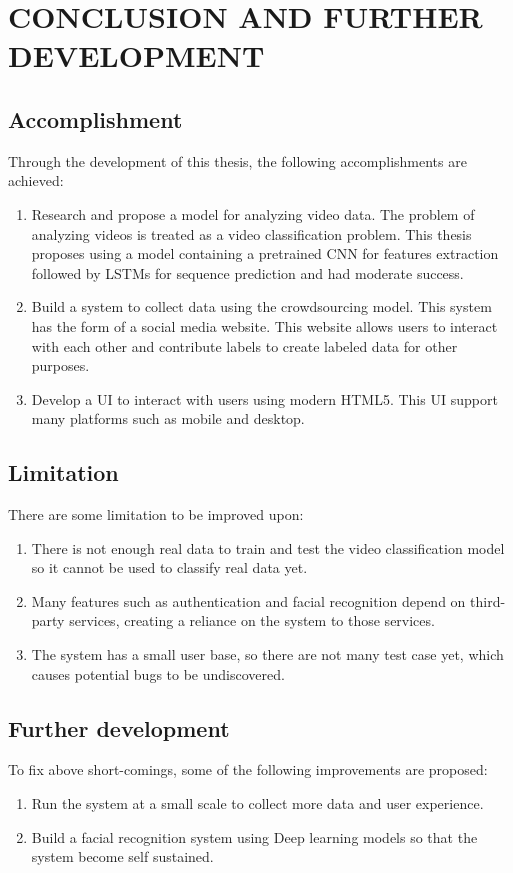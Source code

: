 \chapter{CONCLUSION AND FURTHER DEVELOPMENT}

\section{Accomplishment}
Through the development of this thesis, the following accomplishments are achieved:
\begin{enumerate}
    \item Research and propose a model for analyzing video data. The problem of analyzing videos is treated as a video classification problem. This thesis proposes using a model containing a pretrained CNN for features extraction followed by LSTMs for sequence prediction and had moderate success.
    \item Build a system to collect data using the crowdsourcing model. This system has the form of a social media website. This website allows users to interact with each other and contribute labels to create labeled data for other purposes.
    \item Develop a UI to interact with users using modern HTML5. This UI support many platforms such as mobile and desktop.
\end{enumerate}


\section{Limitation}
There are some limitation to be improved upon:

\begin{enumerate}

\item There is not enough real data to train and test the video classification model so it cannot be used to classify real data yet.
\item Many features such as authentication and facial recognition depend on third-party services, creating a reliance on the system to those services.
\item The system has a small user base, so there are not many test case yet, which causes potential bugs to be undiscovered.
\end{enumerate}

\section{Further development}
To fix above short-comings, some of the following improvements are proposed:

\begin{enumerate}
\item Run the system at a small scale to collect more data and user experience.
\item Build a facial recognition system using Deep learning models so that the system become self sustained.
\end{enumerate}

